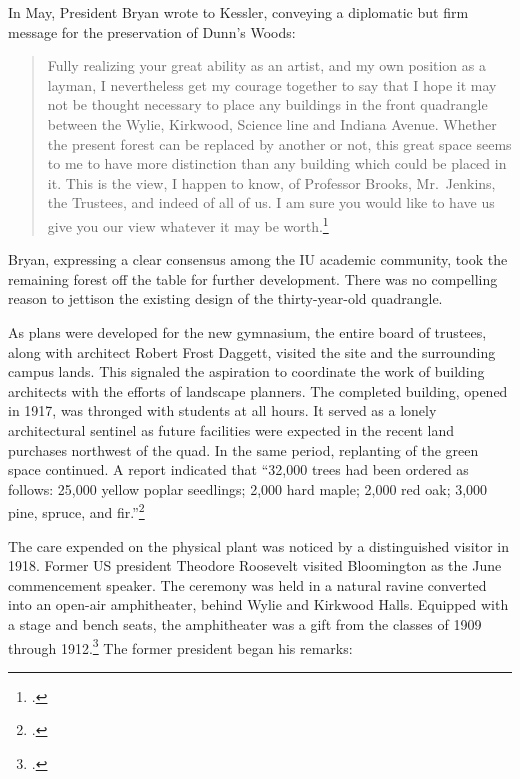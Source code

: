 \documentclass[
  american,
  letterpaper,
]{scrreprt}
\begin{document}
In May, President Bryan wrote to Kessler, conveying a diplomatic but
firm message for the preservation of Dunn's Woods:

\begin{quote}
Fully realizing your great ability as an artist, and my own position as
a layman, I nevertheless get my courage together to say that I hope it
may not be thought necessary to place any buildings in the front
quadrangle between the Wylie, Kirkwood, Science line and Indiana Avenue.
Whether the present forest can be replaced by another or not, this great
space seems to me to have more distinction than any building which could
be placed in it. This is the view, I happen to know, of Professor
Brooks, Mr.~Jenkins, the Trustees, and indeed of all of us. I am sure
you would like to have us give you our view whatever it may be
worth.\footnote{.}
\end{quote}

Bryan, expressing a clear consensus among the IU academic community,
took the remaining forest off the table for further development. There
was no compelling reason to jettison the existing design of the
thirty-year-old quadrangle.

As plans were developed for the new gymnasium, the entire board of
trustees, along with architect Robert Frost Daggett, visited the site
and the surrounding campus lands. This signaled the aspiration to
coordinate the work of building architects with the efforts of landscape
planners. The completed building, opened in 1917, was thronged with
students at all hours. It served as a lonely architectural sentinel as
future facilities were expected in the recent land purchases northwest
of the quad. In the same period, replanting of the green space
continued. A report indicated that ``32,000 trees had been ordered as
follows: 25,000 yellow poplar seedlings; 2,000 hard maple; 2,000 red
oak; 3,000 pine, spruce, and fir.''\footnote{.}

The care expended on the physical plant was noticed by a distinguished
visitor in 1918. Former US president Theodore Roosevelt visited
Bloomington as the June commencement speaker. The ceremony was held in a
natural ravine converted into an open-air amphitheater, behind Wylie and
Kirkwood Halls. Equipped with a stage and bench seats, the amphitheater
was a gift from the classes of 1909 through 1912.\footnote{.} The former president
began his remarks:
\end{document}
